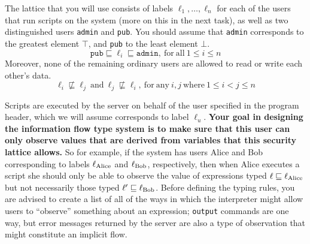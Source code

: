 \documentclass[11pt]{article}
\begin{document}
{The lattice that you will use consists of labels $\ell_1, \ldots, \ell_n$ for each of the users that run 
scripts on the system (more on this in the next task), as well as two distinguished users \verb'admin' and
 \verb'pub'. You should assume that \verb'admin' corresponds to the greatest element $\top$, and \verb'pub'
  to the least element $\bot$.
\begin{equation}
\mathtt{pub} \sqsubseteq \ell_i \sqsubseteq \mathtt{admin},~\mathrm{for~all}~1 \le i \le n
\end{equation}
Moreover, none of the remaining ordinary users are allowed to read or write each other's data.
\begin{equation}
\ell_i \not\sqsubseteq \ell_j~\mathrm{and}~\ell_j \not\sqsubseteq \ell_i,~\mathrm{for~any}~i,j~\mathrm{where}~1\le i < j \le n
\end{equation}

Scripts are executed by the server on behalf of the user specified in the program header, which we will assume corresponds 
to label $\ell_u$. \textbf{Your goal in designing the information flow type system is to make sure that this user can only 
observe values that are derived from variables that this security lattice allows.} So for example, if the system has users 
Alice and Bob corresponding to labels $\ell_{\rm Alice}$ and $\ell_{\rm Bob}$, respectively, then when Alice executes a 
script she should only be able to observe the value of expressions typed $\ell \sqsubseteq \ell_{\rm Alice}$ but not 
necessarily those typed $\ell' \sqsubseteq \ell_{\rm Bob}$. Before defining the typing rules, you are advised to create a 
list of all of the ways in which the interpreter might allow users to ``observe'' something about an expression; 
\verb'output' commands are one way, but error messages returned by the server are also a type of observation that might 
constitute an implicit flow.

}
\end{document}
